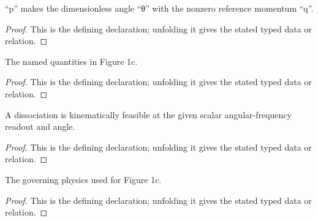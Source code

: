 \begin{definition}[MakesAngle]
  \label{decl:physics:IPhO_2026_1_C_2:MakesAngle}
  “p” makes the dimensionless angle “θ” with the nonzero reference momentum “q”.
\end{definition}
\begin{proof}
  This is the defining declaration; unfolding it gives the stated typed data or relation.
\end{proof}

\begin{definition}[OzonePhotodissociationSetup]
  \label{decl:physics:IPhO_2026_1_C_2:OzonePhotodissociationSetup}
  The named quantities in Figure 1c.
\end{definition}
\begin{proof}
  This is the defining declaration; unfolding it gives the stated typed data or relation.
\end{proof}

\begin{definition}[DissociationAt]
  \label{decl:physics:IPhO_2026_1_C_2:DissociationAt}
  A dissociation is kinematically feasible at the given scalar angular-frequency readout and angle.
\end{definition}
\begin{proof}
  This is the defining declaration; unfolding it gives the stated typed data or relation.
\end{proof}

\begin{definition}[ValidOzonePhotodissociationPhysics]
  \label{decl:physics:IPhO_2026_1_C_2:ValidOzonePhotodissociationPhysics}
  The governing physics used for Figure 1c.
\end{definition}
\begin{proof}
  This is the defining declaration; unfolding it gives the stated typed data or relation.
\end{proof}

